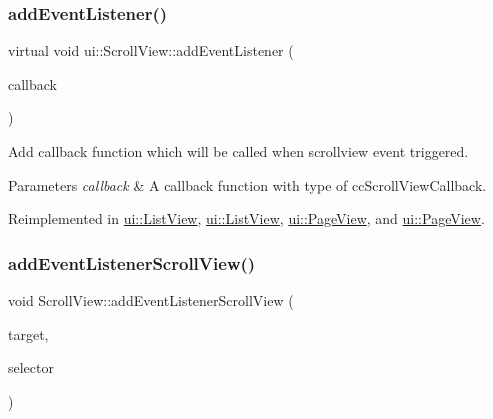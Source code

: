 \mbox{\label{classui_1_1ScrollView_a5e0073af37aaba3862eeba44cfa5da7a}} 
\subsubsection{\texorpdfstring{add\+Event\+Listener()}{addEventListener()}\hspace{0.1cm}{\footnotesize\ttfamily [2/2]}}
{\footnotesize\ttfamily virtual void ui\+::\+Scroll\+View\+::add\+Event\+Listener (\begin{DoxyParamCaption}\item[{const \hyperlink{classui_1_1ScrollView_ae836cc55536c3cc4f4db5cb99c3c88d5}{cc\+Scroll\+View\+Callback} \&}]{callback }\end{DoxyParamCaption})\hspace{0.3cm}{\ttfamily [virtual]}}

Add callback function which will be called when scrollview event triggered. 
\begin{DoxyParams}{Parameters}
{\em callback} & A callback function with type of {\ttfamily cc\+Scroll\+View\+Callback}. \\
\hline
\end{DoxyParams}


Reimplemented in \hyperlink{classui_1_1ListView_ac9579703c37e0c23eba035fe31e00ba5}{ui\+::\+List\+View}, \hyperlink{classui_1_1ListView_ac9579703c37e0c23eba035fe31e00ba5}{ui\+::\+List\+View}, \hyperlink{classui_1_1PageView_a8887593dc71c203af06f8043082d2de4}{ui\+::\+Page\+View}, and \hyperlink{classui_1_1PageView_a8887593dc71c203af06f8043082d2de4}{ui\+::\+Page\+View}.

\mbox{\label{classui_1_1ScrollView_accb739c82acfb7dd0db5a33f68519356}} 
\subsubsection{\texorpdfstring{add\+Event\+Listener\+Scroll\+View()}{addEventListenerScrollView()}\hspace{0.1cm}{\footnotesize\ttfamily [1/2]}}
{\footnotesize\ttfamily void Scroll\+View\+::add\+Event\+Listener\+Scroll\+View (\begin{DoxyParamCaption}\item[{\hyperlink{classRef}{Ref} $\ast$}]{target,  }\item[{S\+E\+L\+\_\+\+Scroll\+View\+Event}]{selector }\end{DoxyParamCaption})}

